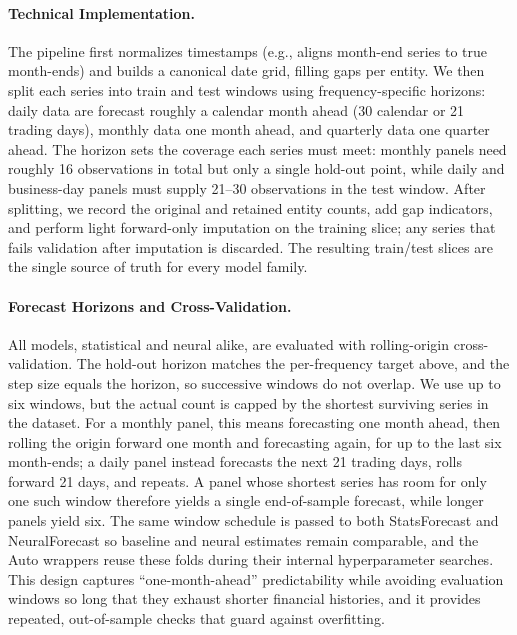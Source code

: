 \documentclass{article}
\begin{document}
\paragraph{Technical Implementation.} The pipeline first normalizes timestamps (e.g., aligns month-end series to true month-ends) and builds a canonical date grid, filling gaps per entity. We then split each series into train and test windows using frequency-specific horizons: daily data are forecast roughly a calendar month ahead (30 calendar or 21 trading days), monthly data one month ahead, and quarterly data one quarter ahead. The horizon sets the coverage each series must meet: monthly panels need roughly 16 observations in total but only a single hold-out point, while daily and business-day panels must supply 21--30 observations in the test window. After splitting, we record the original and retained entity counts, add gap indicators, and perform light forward-only imputation on the training slice; any series that fails validation after imputation is discarded. The resulting train/test slices are the single source of truth for every model family.

\paragraph{Forecast Horizons and Cross-Validation.} All models, statistical and neural alike, are evaluated with rolling-origin cross-validation. The hold-out horizon matches the per-frequency target above, and the step size equals the horizon, so successive windows do not overlap. We use up to six windows, but the actual count is capped by the shortest surviving series in the dataset. For a monthly panel, this means forecasting one month ahead, then rolling the origin forward one month and forecasting again, for up to the last six month-ends; a daily panel instead forecasts the next 21 trading days, rolls forward 21 days, and repeats. A panel whose shortest series has room for only one such window therefore yields a single end-of-sample forecast, while longer panels yield six. The same window schedule is passed to both StatsForecast and NeuralForecast so baseline and neural estimates remain comparable, and the Auto wrappers reuse these folds during their internal hyperparameter searches. This design captures ``one-month-ahead'' predictability while avoiding evaluation windows so long that they exhaust shorter financial histories, and it provides repeated, out-of-sample checks that guard against overfitting.
\end{document}
